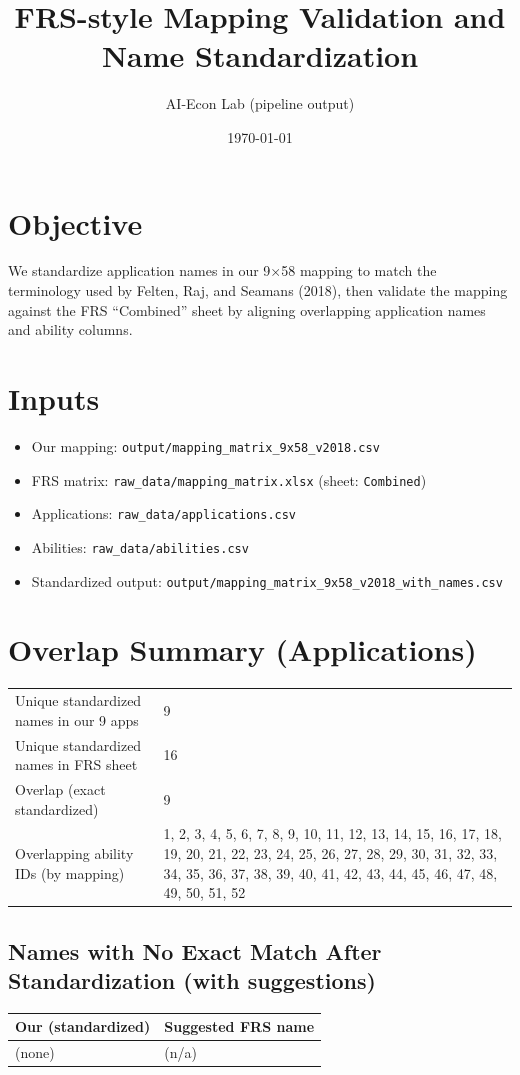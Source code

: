 \documentclass[11pt]{article}
\title{FRS-style Mapping Validation and Name Standardization}
\author{AI-Econ Lab (pipeline output)}
\date{\today}
\begin{document}
\maketitle

\section*{Objective}
We standardize application names in our 9$\times$58 mapping to match the terminology used by Felten, Raj, and Seamans (2018), then validate the mapping against the FRS ``Combined'' sheet by aligning overlapping application names and ability columns.

\section*{Inputs}
\begin{itemize}
  \item Our mapping: \texttt{output/mapping_matrix_9x58_v2018.csv}
  \item FRS matrix: \texttt{raw_data/mapping_matrix.xlsx} (sheet: \texttt{Combined})
  \item Applications: \texttt{raw_data/applications.csv}
  \item Abilities: \texttt{raw_data/abilities.csv}
  \item Standardized output: \texttt{output/mapping_matrix_9x58_v2018_with_names.csv}
\end{itemize}

\section*{Overlap Summary (Applications)}
\begin{tabular}{@{}ll@{}}
\toprule
Unique standardized names in our 9 apps & 9 \\
Unique standardized names in FRS sheet & 16 \\
Overlap (exact standardized) & 9 \\
Overlapping ability IDs (by mapping) & 1, 2, 3, 4, 5, 6, 7, 8, 9, 10, 11, 12, 13, 14, 15, 16, 17, 18, 19, 20, 21, 22, 23, 24, 25, 26, 27, 28, 29, 30, 31, 32, 33, 34, 35, 36, 37, 38, 39, 40, 41, 42, 43, 44, 45, 46, 47, 48, 49, 50, 51, 52 \\
\bottomrule
\end{tabular}

\subsection*{Names with No Exact Match After Standardization (with suggestions)}
\begin{longtable}{@{}ll@{}}
\toprule
Our (standardized) & Suggested FRS name \\
\midrule
\endhead
 (none) & (n/a) \\
\bottomrule
\end{longtable}
\end{document}

